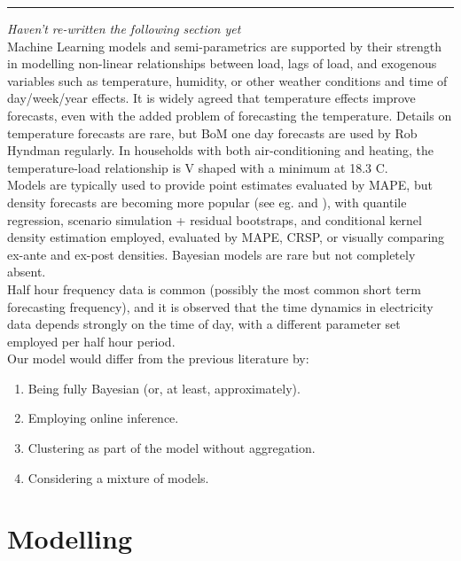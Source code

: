 \documentclass[
12pt, %
onehalfspacing, %
nohyperref, %
headsepline, %
chapterinoneline, %
]{MastersDoctoralThesis} %
\begin{document}
\hrule
\vspace{3mm}
\textit{Haven't re-written the following section yet}
\\

Machine Learning models and semi-parametrics are supported by their strength in modelling non-linear relationships between load, lags of load, and exogenous variables such as temperature, humidity, or other weather conditions and time of day/week/year effects. It is widely agreed that temperature effects improve forecasts, even with the added problem of forecasting the temperature. Details on temperature forecasts are rare, but BoM one day forecasts are used by Rob Hyndman regularly. In households with both air-conditioning and heating, the temperature-load relationship is V shaped with a minimum at 18.3 C.
\\

Models are typically used to provide point estimates evaluated by MAPE, but density forecasts are becoming more popular (see eg. \cite{Arora2016} and \cite{Taieb2016}), with quantile regression, scenario simulation + residual bootstraps, and conditional kernel density estimation employed, evaluated by MAPE, CRSP, or visually comparing ex-ante and ex-post densities. Bayesian models are rare but not completely absent.
\\

Half hour frequency data is common (possibly the most common short term forecasting frequency), and it is observed that the time dynamics in electricity data depends strongly on the time of day, with a different parameter set employed per half hour period.
\\

Our model would differ from the previous literature by:
\begin{enumerate}
\item Being fully Bayesian (or, at least, approximately).
\item Employing online inference.
\item Clustering as part of the model without aggregation.
\item Considering a mixture of models.
\end{enumerate}



\section{Modelling}
\label{sec:elecModel}
\end{document}

